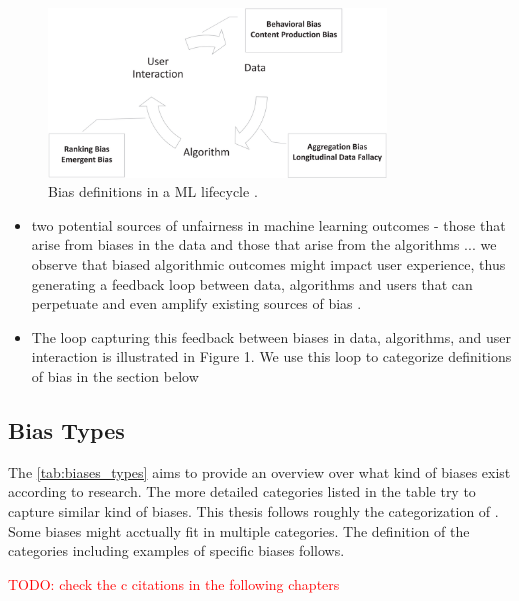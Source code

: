 \documentclass[12pt, a4paper, oneside]{book}   	%
\renewcommand{\todo}[1]{\textcolor{red}{TODO: #1}}
\newif\ifrawcitationactive
\newcommand{\rawcitationusedstart}{\color{violet}}
\newcommand{\rawcitationusedend}{%
	\ifrawcitationactive
	\color{purple}  %
	\else
	\color{black}  %
	\fi
}
\begin{document}
			\begin{figure}[H]
				\centering
				\includegraphics[width=0.8\textwidth]{figures/BiasCategoriesInMLLifecycle.png}
				\caption{Bias definitions in a \gls{ML} lifecycle \autocite{Mehrabi_2021}.}
				\label{fig:bias_definitions_ML_lifecycle}
			\end{figure}
			
			\rawcitationusedstart
			\begin{itemize}
				\item two potential sources of unfairness in machine learning outcomes - those that arise from biases in the data and those that arise from the algorithms ... we observe that biased algorithmic outcomes might impact user experience, thus generating a feedback loop between data, algorithms and users that can perpetuate and even amplify existing sources of bias \autocite{Mehrabi_2021}.
				\item The loop capturing this feedback between biases in data, algorithms, and user interaction is illustrated in Figure 1. We use this loop to categorize definitions of bias in the section below \autocite{Mehrabi_2021}
			\end{itemize}
			\rawcitationusedend
			
			
			\subsection{Bias Types}
			 The \autoref{tab:biases_types} aims to provide an overview over what kind of biases exist according to research. The more detailed categories listed in the table try to capture similar kind of biases. This thesis follows roughly the categorization of \textcite{Mehrabi_2021}. Some biases might acctually fit in multiple categories. The definition of the categories including examples of specific biases follows.
			
			\todo{check the c citations in the following chapters}
			
\end{document}
